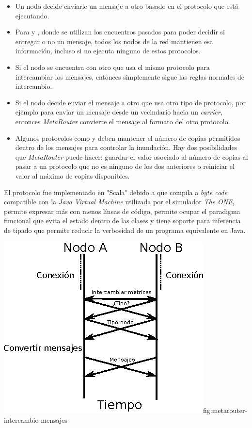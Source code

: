 \begin{itemize}
  \item Un nodo decide enviarle un mensaje a otro basado en el protocolo que
    está ejecutando.
  \item Para \maxprop{} y \prophet{}, donde se utilizan los encuentros pasados
    para poder decidir si entregar o no un mensaje, todos los nodos de la red
    mantienen esa información, incluso si no ejecuta ninguno de estos
    protocolos.
  \item Si el nodo se encuentra con otro que usa el mismo protocolo para
    intercambiar los mensajes, entonces simplemente sigue las reglas normales de
    intercambio.
  \item Si el nodo decide enviar el mensaje a otro que usa otro tipo de
    protocolo, por ejemplo para enviar un mensaje desde un vecindario hacia un
    \textit{carrier}, entonces \textit{MetaRouter} convierte el mensaje al
    formato del otro protocolo.
  \item Algunos protocolos como \syw{} y \syf{} deben mantener el número de
    copias permitidos dentro de los mensajes para controlar la inundación. Hay
    dos posibilidades que \textit{MetaRouter} puede hacer: guardar el valor
    asociado al número de copias al pasar a un protocolo que no es ninguno de
    los dos anteriores o reiniciar el valor al máximo de copias disponibles.
\end{itemize}



El protocolo fue implementado en "Scala" debido a que compila a \textit{byte
code} compatible con la \textit{Java Virtual Machine} utilizada por el simulador
\textit{The ONE}, permite expresar más con menos líneas de código, permite
ocupar el paradigma funcional que evita el estado dentro de las clases y tiene
soporte para inferencia de tipado que permite reducir la verbosidad de un
programa equivalente en Java.


{\includegraphics[scale=1.75]{imagenes/metarouter/metarouter_diagrama.eps}}{fig:metarouter-intercambio-mensajes}


